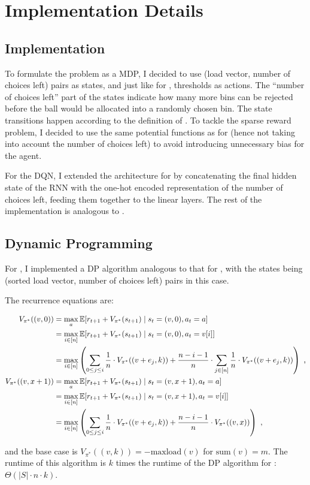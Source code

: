 \chapter{\KThinning Implementation Details}\label{k-thinning details} 


\section*{\DQL Implementation}


To formulate the \KThinning problem as a MDP, I decided to use (load vector, number of choices left) pairs as states, and just like for \TwoThinning, thresholds as actions. The ``number of choices left'' part of the states indicate how many more bins can be rejected before the ball would be allocated into a randomly chosen bin. The state transitions happen according to the definition of \KThinning. To tackle the sparse reward problem, I decided to use the same potential functions as for \TwoThinning (hence not taking into account the number of choices left) to avoid introducing unnecessary bias for the agent.


For the DQN, I extended the architecture for \TwoThinning by concatenating the final hidden state of the RNN with the one-hot encoded representation of the number of choices left, feeding them together to the linear layers. The rest of the implementation is analogous to \TwoThinning.



\section*{Dynamic Programming}

For \KThinning, I implemented a DP algorithm analogous to that for \TwoThinning, with the states being (sorted load vector, number of choices left) pairs in this case.


The recurrence equations are:

\begin{align} 
    V_{\pi^*}((v, 0)) &= \max_a \mathbb{E} [r_{t+1} + V_{\pi^*}(s_{t+1}) \mid s_t=(v,0), a_t=a] \notag \\
    &= \max_{i \in [n]} \mathbb{E} [r_{t+1} + V_{\pi^*}(s_{t+1}) \mid s_t=(v,0), a_t=v[i]] \notag \\
    &= \max_{i \in [n]} \left(\sum_{0\leq j \leq i} \frac{1}{n}\cdot V_{\pi^*}((v+e_j,k)) + \frac{n-i-1}{n} \cdot  \sum_{j \in [n]} \frac{1}{n}\cdot V_{\pi^*}((v+e_j,k))\right) \text{ ,} \label{eq:kthinning-dynamicprogramming} \\
    V_{\pi^*}((v, x+1)) &= \max_a \mathbb{E} [r_{t+1} + V_{\pi^*}(s_{t+1}) \mid s_t=(v,x+1), a_t=a] \notag \\
    &= \max_{i \in [n]} \mathbb{E} [r_{t+1} + V_{\pi^*}(s_{t+1}) \mid s_t=(v, x+1), a_t=v[i]] \notag \\
    &= \max_{i \in [n]} \left(\sum_{0\leq j \leq i} \frac{1}{n}\cdot V_{\pi^*}((v+e_j,k)) + \frac{n-i-1}{n} \cdot  V_{\pi^*}((v, x))\right) \text{ ,}
\end{align}

and the base case is $V_{\pi^*}((v, k))=-\mathrm{maxload}(v)$ for $\mathrm{sum}(v)=m$. The runtime of this algorithm is $k$ times the runtime of the DP algorithm for \TwoThinning: $\Theta(|S|\cdot n\cdot k)$.